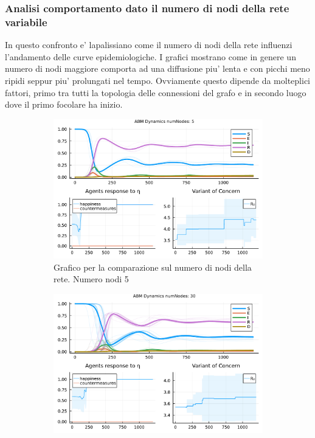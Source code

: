 \subsubsection{Analisi comportamento dato il numero di nodi della rete variabile}
In questo confronto e' lapalissiano come il numero di nodi della rete influenzi l'andamento delle curve epidemiologiche. 
I grafici mostrano come in genere un numero di nodi maggiore comporta ad una diffusione piu' lenta e con picchi meno ripidi
seppur piu' prolungati nel tempo. Ovviamente questo dipende da molteplici fattori, primo tra tutti la topologia delle connessioni 
del grafo e in secondo luogo dove il primo focolare ha inizio. 

\begin{figure}[!hb]
	\centering
	\begin{subfigure}[b]{0.45\textwidth}
		\centering
		\includegraphics[width=\textwidth]{img/SocialNetworkABM_1_NN.pdf}
		\caption{Grafico per la comparazione sul numero di nodi della rete. Numero nodi 5}
		\label{fig:comparison_numberOfNodes_5}
	\end{subfigure}
	\hfill
	\begin{subfigure}[b]{0.45\textwidth}
		\centering
		\includegraphics[width=\textwidth]{img/SocialNetworkABM_2_NN.pdf}

\end{subfigure}
\end{figure}
